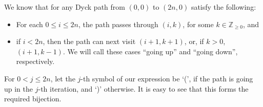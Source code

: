 \documentclass[12pt]{article}
\begin{document}
We know that for any Dyck path from $(0,0)$ to $(2n,0)$ satisfy the following:
\begin{itemize}
\item For each $0\le i\le 2n$, the path passes through $(i,k)$, for some $k\in \mathbb{Z}_{\ge0}$, and 
\item if $i<2n$, then the path can next visit $(i+1,k+1)$, or, if $k>0$, $(i+1,k-1)$. We will call these cases ``going up'' and ``going down'', respectively.
\end{itemize}

For $0<j\le 2n$, let the $j$-th symbol of our expression be `(', if the path is going up in the $j$-th iteration, and `)' otherwise. It is easy to see that this forms the required bijection.
\end{document}
